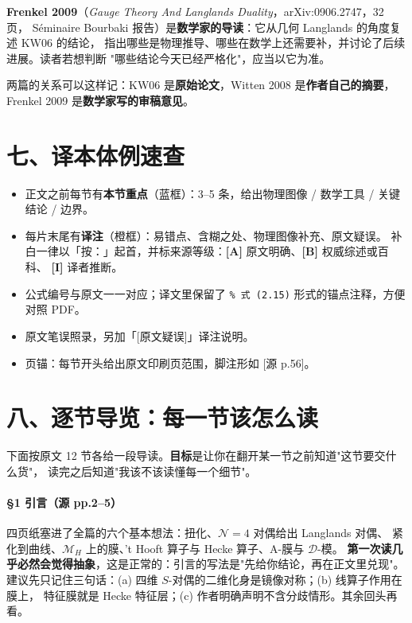 \documentclass[11pt,a4paper]{article}
\newcommand{\MH}{\mathcal{M}_H}
\newcommand{\Nfour}{\mathcal{N}=4}
\newcommand{\src}[1]{{\color{gray!70}\footnotesize[#1]}}
\newcommand{\kw}{\textsf{KW06}}
\begin{document}
\textbf{Frenkel 2009}（\emph{Gauge Theory And Langlands Duality}，arXiv:0906.2747，32 页，
Séminaire Bourbaki 报告）是\textbf{数学家的导读}：它从几何 Langlands 的角度复述 \kw{} 的结论，
指出哪些是物理推导、哪些在数学上还需要补，并讨论了后续进展。读者若想判断
"哪些结论今天已经严格化"，应当以它为准。

两篇的关系可以这样记：\kw{} 是\textbf{原始论文}，Witten 2008 是\textbf{作者自己的摘要}，
Frenkel 2009 是\textbf{数学家写的审稿意见}。

\section*{七、译本体例速查}

\begin{itemize}[leftmargin=1.6em]
  \item 正文之前每节有\textbf{本节重点}（蓝框）：3--5 条，给出物理图像 / 数学工具 / 关键结论 / 边界。
  \item 每片末尾有\textbf{译注}（橙框）：易错点、含糊之处、物理图像补充、原文疑误。
        补白一律以「按：」起首，并标来源等级：\textbf{[A]} 原文明确、\textbf{[B]} 权威综述或百科、
        \textbf{[I]} 译者推断。
  \item 公式编号与原文一一对应；译文里保留了 \texttt{\% 式 (2.15)} 形式的锚点注释，方便对照 PDF。
  \item 原文笔误照录，另加「[原文疑误]」译注说明。
  \item 页锚：每节开头给出原文印刷页范围，脚注形如 \src{源 p.56}。
\end{itemize}


\section*{八、逐节导览：每一节该怎么读}

下面按原文 12 节各给一段导读。\textbf{目标}是让你在翻开某一节之前知道"这节要交什么货"，
读完之后知道"我该不该读懂每一个细节"。

\paragraph{\S1 引言（源 pp.2--5）}
四页纸塞进了全篇的六个基本想法：扭化、$\Nfour$ 对偶给出 Langlands 对偶、
紧化到曲线、$\MH${} 上的膜、't Hooft 算子与 Hecke 算子、A-膜与 $\mathcal{D}$-模。
\textbf{第一次读几乎必然会觉得抽象}，这是正常的：引言的写法是"先给你结论，再在正文里兑现"。
建议先只记住三句话：(a) 四维 $S$-对偶的二维化身是镜像对称；(b) 线算子作用在膜上，
特征膜就是 Hecke 特征层；(c) 作者明确声明不含分歧情形。其余回头再看。
\end{document}
